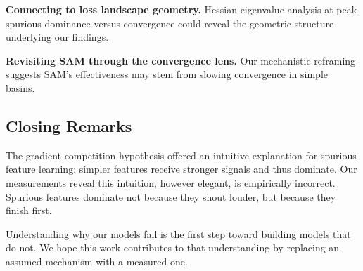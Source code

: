 \textbf{Connecting to loss landscape geometry.} Hessian eigenvalue analysis at peak spurious dominance versus convergence could reveal the geometric structure underlying our findings.

\textbf{Revisiting SAM through the convergence lens.} Our mechanistic reframing suggests SAM's effectiveness may stem from slowing convergence in simple basins.

\subsection{Closing Remarks}

The gradient competition hypothesis offered an intuitive explanation for spurious feature learning: simpler features receive stronger signals and thus dominate. Our measurements reveal this intuition, however elegant, is empirically incorrect. Spurious features dominate not because they shout louder, but because they finish first.

Understanding why our models fail is the first step toward building models that do not. We hope this work contributes to that understanding by replacing an assumed mechanism with a measured one.
